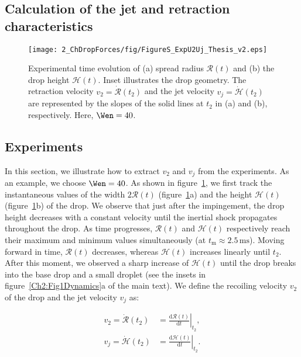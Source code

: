 \begin{subappendices}
	\pagebreak 
	
	\section{Calculation of the jet and retraction characteristics}\label{Ch2:SecDetails}
	
	\begin{figure}
		\texttt{[image: 2\_ChDropForces/fig/FigureS\_ExpU2Uj\_Thesis\_v2.eps]}
		\caption{Experimental time evolution of (a) spread radius $\mathcal{R}(t)$ and (b) the drop height $\mathcal{H}(t)$. Inset illustrates the drop geometry. The retraction velocity $v_2 = \dot{\mathcal{R}}(t_2)$ and the jet velocity $v_j = \dot{\mathcal{H}}(t_2)$ are represented by the slopes of the solid lines at $t_2$ in (a) and (b), respectively. Here, $\Wen = 40$.}
		\label{Ch2:Fig_ExpU2Uj}
	\end{figure}
	
	\subsection{Experiments}	
	In this section, we illustrate how to extract $v_2$ and $v_j$ from the experiments. As an example, we choose $\Wen = 40$. As shown in figure~\ref{Ch2:Fig_ExpU2Uj}, we first track the instantaneous values of the width $2\mathcal{R}(t)$ (figure~\ref{Ch2:Fig_ExpU2Uj}a) and the height $\mathcal{H}(t)$ (figure~\ref{Ch2:Fig_ExpU2Uj}b) of the drop. We observe that just after the impingement, the drop height decreases with a constant velocity \cite{eggers2010drop, Gordillo2018} until the inertial shock propagates throughout the drop. As time progresses, $\mathcal{R}(t)$ and $\mathcal{H}(t)$ respectively reach their maximum and minimum values simultaneously (at $t_{\mathrm{m}} \approx 2.5\,\si{\milli\second}$). Moving forward in time, $\mathcal{R}(t)$ decreases, whereas $\mathcal{H}(t)$ increases linearly until $t_2$. After this moment, we observed a sharp increase of $\mathcal{H}(t)$ until the drop breaks into the base drop and a small droplet (see the insets in figure~\ref{Ch2:Fig1Dynamics}a of the main text). We define the recoiling velocity $v_2$ of the drop and the jet velocity $v_j$ as:
	
	\begin{align}
		v_2 = \dot{\mathcal{R}}(t_2) &= \left. \frac{\mathrm{d}\mathcal{R}(t)}{\mathrm{d}t} \right|_{t_2},\\
		v_j = \dot{\mathcal{H}}(t_2) &= \left. \frac{\mathrm{d}\mathcal{H}(t)}{\mathrm{d}t} \right|_{t_2}.
	\end{align}
	

\end{subappendices}
